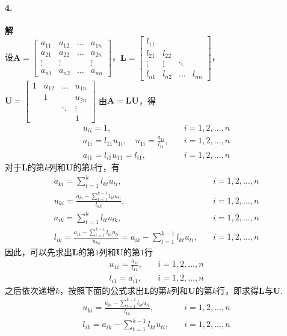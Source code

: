 \paragraph{4.} \textbf{解}\\
设$\mathbf{A} = \begin{bmatrix}
a_{11} & a_{12} & \dots & a_{1n} \\ 
a_{21} & a_{22} & \dots & a_{2n} \\ 
\vdots & \vdots &  & \vdots \\ 
a_{n1} & a_{n2} & \dots & a_{nn} 
\end{bmatrix}$，$\mathbf{L} = \begin{bmatrix}
l_{11} &  &  &  \\ 
l_{21} &  l_{22} &  &  \\ 
\vdots & \vdots & \ddots &  \\ 
l_{n1} & l_{n2} & \dots & l_{nn} 
\end{bmatrix}$，$\mathbf{U} = \begin{bmatrix}
1 & u_{12} & \dots & u_{1n} \\ 
 &  1 &  & u_{2n} \\ 
 &  & \ddots &  \vdots\\ 
 &  &  & 1 
\end{bmatrix}$
由$\mathbf{A} = \mathbf{LU}$，得
\[\begin{split}
u_{ii} = 1, & \quad i = 1,2,\dots,n \\
a_{1i} = l_{11}u_{1i}, \quad u_{1i} = \frac{a_{1i}}{l_{11}}, & \quad i = 1,2,\dots,n \\
a_{i1} = l_{i1}u_{11} = l_{i1}, & \quad i = 1,2,\dots,n
\end{split}\]
对于$\mathbf{L}$的第$k$列和$\mathbf{U}$的第$k$行，有
\[\begin{split}
a_{ki} = \sum_{t = 1}^{k}l_{kt}u_{ti}, & \quad i = 1,2,\dots,n \\
u_{ki} = \frac{a_{ki} - \sum_{t = 1}^{k - 1}l_{kt}u_{ti}}{l_{kk}}, & \quad i = 1,2,\dots,n \\
a_{ik} = \sum_{t = 1}^{k}l_{it}u_{tk}, & \quad i = 1,2,\dots,n \\
l_{ik} = \frac{a_{ik} - \sum_{t = 1}^{k - 1}l_{kt}u_{ti}}{u_{kk}} = a_{ik} - \sum_{t = 1}^{k - 1}l_{kt}u_{ti}, & \quad i = 1,2,\dots,n 
\end{split}\]
因此，可以先求出$\mathbf{L}$的第$1$列和$\mathbf{U}$的第$1$行
\[\begin{split}
u_{1i} = \frac{a_{1i}}{l_{11}}, & \quad i = 1,2,\dots,n \\
l_{i1} = a_{i1}, & \quad i = 1,2,\dots,n
\end{split}\]
之后依次递增$k$，按照下面的公式求出$\mathbf{L}$的第$k$列和$\mathbf{U}$的第$k$行，即求得$\mathbf{L}$与$\mathbf{U}$.
\[\begin{split}
u_{ki} = \frac{a_{ki} - \sum_{t = 1}^{k - 1}l_{kt}u_{ti}}{l_{kk}}, & \quad i = 1,2,\dots,n \\
l_{ik} = a_{ik} - \sum_{t = 1}^{k - 1}l_{kt}u_{ti}, & \quad i = 1,2,\dots,n 
\end{split}\]
\newline

